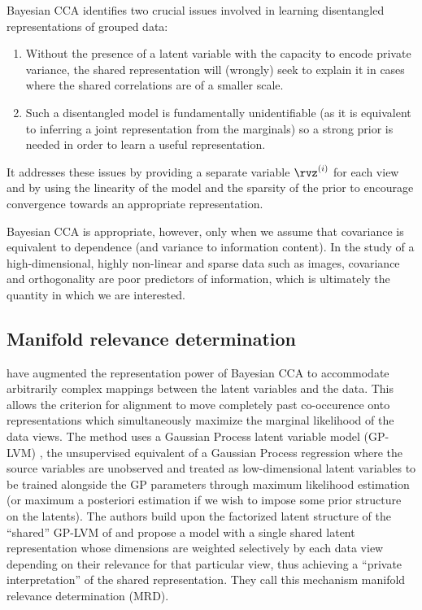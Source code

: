\documentclass[withindex,glossary,firstyr,times]{cam-thesis}
\begin{document}
Bayesian CCA identifies two crucial issues involved in learning disentangled representations of grouped data: 
\begin{enumerate}
    \item Without the presence of a latent variable with the capacity to encode private variance, the shared representation will (wrongly) seek to explain it in cases where the shared correlations are of a smaller scale.
    \item Such a disentangled model is fundamentally unidentifiable (as it is equivalent to inferring a joint representation from the marginals) so a strong prior is needed in order to learn a useful representation.
\end{enumerate}
It addresses these issues by providing a separate variable $\rvz^{(i)}$ for each view and by using the linearity of the model and the sparsity of the prior to encourage convergence towards an appropriate representation.

Bayesian CCA is appropriate, however, only when we assume that covariance is equivalent to dependence (and variance to information content). In the study of a high-dimensional, highly non-linear and sparse data such as images, covariance and orthogonality are poor predictors of information, which is ultimately the quantity in which we are interested.

\subsection{Manifold relevance determination} 

\citet{damianou2016multi} have augmented the representation power of Bayesian CCA to accommodate arbitrarily complex mappings between the latent variables and the data. This allows the criterion for alignment to move completely past co-occurence onto representations which simultaneously maximize the marginal likelihood of the data views. The method uses a Gaussian Process latent variable model (GP-LVM) \cite{lawrence2004gaussian}, the unsupervised equivalent of a Gaussian Process regression where the source variables are unobserved and treated as low-dimensional latent variables to be trained alongside the GP parameters through maximum likelihood estimation (or maximum a posteriori estimation if we wish to impose some prior structure on the latents). The authors build upon the factorized latent structure of the ``shared'' GP-LVM of \citet{ek2008gp} and propose a model with a single shared latent representation whose dimensions are weighted selectively by each data view depending on their relevance for that particular view, thus achieving a ``private interpretation'' of the shared representation. They call this mechanism manifold relevance determination (MRD).
\end{document}
